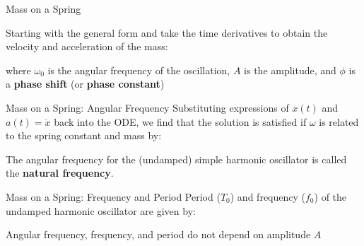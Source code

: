 \documentclass[12pt,compress,aspectratio=169]{beamer}
\begin{document}
\begin{frame}{Mass on a Spring}

  
  Starting with the general form and take the time derivatives to obtain the
  velocity and acceleration of the mass:
 
  \vspace{-.35in}{\Large
    \begin{align*}
      x(t)&=A\cos(\omega_0 t-\phi)\\
      v(t)&=-A\omega_0\sin(\omega_0 t-\phi)\\
      a(t)&=-A\omega_0^2\cos(\omega_0 t-\phi)=-\omega_0^2x
    \end{align*}
  }
  
  \vspace{-.2in}where $\omega_0$ is the angular frequency of the oscillation,
  $A$ is the amplitude, and $\phi$ is a \textbf{phase shift} (or
  \textbf{phase constant})%
\end{frame}



\begin{frame}{Mass on a Spring: Angular Frequency}
  Substituting expressions of $x(t)$ and $a(t)=\ddot x$ back into the ODE, we
  find that the solution is satisfied if $\omega$ is related to the spring
  constant and mass by:


  The angular frequency for the (undamped) simple harmonic oscillator is called
  the \textbf{natural frequency}.
\end{frame}



\begin{frame}{Mass on a Spring: Frequency and Period}
  Period ($T_0$) and frequency ($f_0$) of the undamped harmonic oscillator are
  given by:

  
  Angular frequency, frequency, and period do not depend on amplitude $A$
\end{frame}
\end{document}
